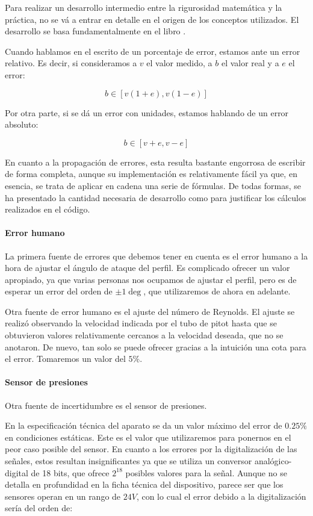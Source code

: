 \documentclass{article}
\begin{document}
Para realizar un desarrollo intermedio entre la rigurosidad matemática y la práctica, no se vá a entrar en detalle
en el origen de los conceptos utilizados. El desarrollo se basa fundamentalmente en el libro \cite{errores}.

Cuando hablamos en el escrito de un porcentaje de error, estamos ante un error relativo. 
Es decir, si consideramos a $v$ el valor medido, a $b$ el valor real y a $e$ el error:

$$b \in [v (1 + e), v (1 - e)]$$

Por otra parte, si se dá un error con unidades, estamos hablando de un error absoluto:

$$b \in [v + e, v - e]$$

En cuanto a la propagación de errores, esta resulta bastante engorrosa de escribir de forma completa,
aunque su implementación es relativamente fácil ya que, en esencia, se trata de aplicar en cadena una serie de
fórmulas. De todas formas, se ha presentado la cantidad necesaria de 
desarrollo como para justificar los cálculos realizados en el código.

\paragraph{Error humano}
La primera fuente de errores que debemos tener en cuenta es el error humano a la hora de ajustar el ángulo de 
ataque del perfil. Es complicado ofrecer un valor apropiado, ya que varias personas nos ocupamos de ajustar el perfil, 
pero es de esperar un error del orden de $\pm 1\deg$, que utilizaremos de ahora en adelante.

Otra fuente de error humano es el ajuste del número de Reynolds. El ajuste se realizó observando la velocidad indicada 
por el tubo de pitot hasta que se obtuvieron valores relativamente cercanos a la velocidad deseada, que no se anotaron.
De nuevo, tan solo se puede ofrecer gracias a la intuición una cota para el error. Tomaremos un valor del $5\%$.

\paragraph{Sensor de presiones}

Otra fuente de incertidumbre es el sensor de presiones.

En la especificación técnica del aparato se da un valor máximo del error de $0.25\%$ en condiciones estáticas. Este es el valor 
que utilizaremos para ponernos en el peor caso posible del sensor. 
En cuanto a los errores por la digitalización de las señales, 
estos resultan insignificantes ya que se utiliza un conversor analógico-digital de 18 bits, que ofrece $2^{18}$ posibles valores 
para la señal. Aunque no se detalla en profundidad en la ficha técnica del dispositivo, parece ser que los sensores operan 
en un rango de $24V$, con lo cual el error debido a la digitalización sería del orden de:
\end{document}
